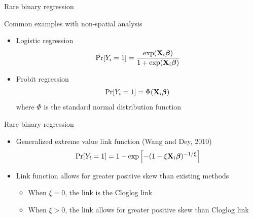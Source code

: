 \documentclass{beamer}
\begin{document}
\begin{frame}{Rare binary regression}
\begin{adjustwidth}{1em}{0em}
  Common examples with non-spatial analysis \vspace{1em}
  \begin{itemize} \setlength{\itemsep}{1em}
    \item Logistic regression
    \begin{align*}
      \Pr[Y_i = 1] = \frac{ \exp(\mbox{\bf X}_i \mbox{\boldmath $\beta$}) }{ 1 + \exp(\mbox{\bf X}_i \mbox{\boldmath $\beta$})}
    \end{align*}
    \item Probit regression
    \begin{align*}
      \Pr[Y_i = 1] = \Phi(\mbox{\bf X}_i \mbox{\boldmath $\beta$})
    \end{align*}
    where $\Phi$ is the standard normal distribution function
  \end{itemize}
\end{adjustwidth}
\end{frame}

\begin{frame}{Rare binary regression}
  \begin{itemize} \setlength{\itemsep}{1em}
    \item Generalized extreme value link function (Wang and Dey, 2010)
    \begin{align*}
      \Pr[Y_i = 1] = 1 - \exp\left[-(1 - \xi \mbox{\bf X}_i \mbox{\boldmath $\beta$})^{-1 / \xi} \right]
    \end{align*}
    \item Link function allows for greater positive skew than existing methods \vspace{0.5em}
    \begin{itemize} \setlength{\itemsep}{0.5em}
      \item When $\xi = 0$, the link is the Cloglog link
      \item When $\xi > 0$, the link allows for greater positive skew than Cloglog link
    \end{itemize}
  \end{itemize}
\end{frame}
\end{document}
